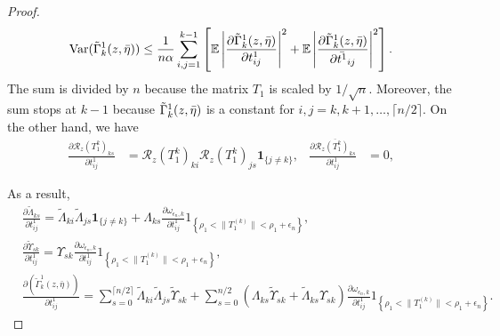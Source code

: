 \documentclass[10pt,a4paper]{amsart}
\newcommand{\Var}{\operatorname{Var}}
\begin{document}
\begin{proof}
\begin{align}
    \Var(\Tilde\Gamma_{k}^1(z,\bar{\eta})) \leq \frac{1}{n\alpha} \sum_{i,j=1}^{k-1}\left[\mathbb{E}\left|\frac{\partial \Tilde\Gamma_{k}^1(z,\bar{\eta})}{\partial t^{1}_{ij}}\right|^2 +\mathbb{E}\left|\frac{\partial \Tilde\Gamma_{k}^1(z,\bar{\eta})}{\partial \bar{t^{1}}_{ij}}\right|^2\right].\label{eqn: variance bound by poincare inequality}
\end{align}
The sum is divided by $n$ because the matrix $T_{1}$ is scaled by $1/\sqrt{n}$. Moreover, the sum stops at $k-1$ because $\Tilde\Gamma_{k}^1(z,\bar{\eta})$ is a constant for $i, j = k,k+1,\dots, \lceil n/2 \rceil$. On the other hand, we have
\begin{align*}
    \frac{\partial \mathcal{R}_{z}(T_1^k)_{ks}}{\partial t_{ij}^1} &= \mathcal{R}_{z}(T_1^k)_{ki} \mathcal{R}_{z}(T_1^k)_{js}\mathbf{1}_{\{j\neq k\}},& 
    \frac{\partial \overline{\mathcal{R}_{z}(T_1^k)_{ks}}}{\partial t_{ij}^1}&=0, 
\end{align*}

As a result,
\begin{align*}
    &\frac{\partial \tilde{\Lambda}_{k s}}{\partial t^{1}_{i j}}=\tilde{\Lambda}_{k i} \tilde{\Lambda}_{j s}\mathbf{1}_{\{j\neq k\}}+\Lambda_{k s} \frac{\partial \omega_{\epsilon_n, k}}{\partial t^{1}_{i j}} 1_{\left\{\rho_1<\|T_{1}^{(k)}\|<\rho_1+\epsilon_n\right\}}, \\
    &\frac{\partial \tilde{\Upsilon}_{s k}}{\partial t^{1}_{i j}}=\Upsilon_{s k} \frac{\partial \omega_{\epsilon_n, k}}{\partial t^{1}_{i j}} 1_{\left\{\rho_1<\|T_{1}^{(k)}\|<\rho_1+\epsilon_n\right\}}, \\
    &\frac{\partial\left(\tilde{\Gamma}_{k}^1(z, \bar{\eta})\right)}{\partial t^{1}_{i j}}=  \sum_{s=0} ^{\lceil n/2 \rceil} \tilde{\Lambda}_{k i} \tilde{\Lambda}_{j s} \tilde{\Upsilon}_{s k}+\sum_{s=0} ^{n/2}\left(\Lambda_{k s } \tilde\Upsilon_{s k}+\tilde{\Lambda}_{k s} \Upsilon_{s k}\right) \frac{\partial \omega_{\epsilon_n, k}}{\partial t^{1}_{i j}} 1_{\left\{\rho_1<\|T_{1}^{(k)}\|<\rho_1+\epsilon_n\right\}}.
\end{align*}


\end{proof}
\end{document}
